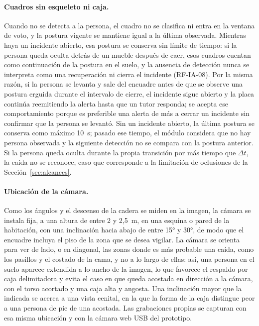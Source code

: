 \documentclass[12pt,a4paper,oneside]{book}
\theoremstyle{plain}
\theoremstyle{definition}
\theoremstyle{remark}
\begin{document}
\paragraph{Cuadros sin esqueleto ni caja.} Cuando no se detecta a la persona, el cuadro no se clasifica ni entra en la ventana de voto, y la postura vigente se mantiene igual a la última observada. Mientras haya un incidente abierto, esa postura se conserva sin límite de tiempo: si la persona queda oculta detrás de un mueble después de caer, esos cuadros cuentan como continuación de la postura en el suelo, y la ausencia de detección nunca se interpreta como una recuperación ni cierra el incidente (RF-IA-08). Por la misma razón, si la persona se levanta y sale del encuadre antes de que se observe una postura erguida durante el intervalo de cierre, el incidente sigue abierto y la placa continúa reemitiendo la alerta hasta que un tutor responda; se acepta ese comportamiento porque es preferible una alerta de más a cerrar un incidente sin confirmar que la persona se levantó. Sin un incidente abierto, la última postura se conserva como máximo 10~s; pasado ese tiempo, el módulo considera que no hay persona observada y la siguiente detección no se compara con la postura anterior. Si la persona queda oculta durante la propia transición por más tiempo que $\Delta t$, la caída no se reconoce, caso que corresponde a la limitación de oclusiones de la Sección~\ref{sec:alcances}.

\paragraph{Ubicación de la cámara.} Como los ángulos y el descenso de la cadera se miden en la imagen, la cámara se instala fija, a una altura de entre 2 y 2,5~m, en una esquina o pared de la habitación, con una inclinación hacia abajo de entre 15° y 30°, de modo que el encuadre incluya el piso de la zona que se desea vigilar. La cámara se orienta para ver de lado, o en diagonal, las zonas donde es más probable una caída, como los pasillos y el costado de la cama, y no a lo largo de ellas: así, una persona en el suelo aparece extendida a lo ancho de la imagen, lo que favorece el respaldo por caja delimitadora y evita el caso en que queda acostada en dirección a la cámara, con el torso acortado y una caja alta y angosta. Una inclinación mayor que la indicada se acerca a una vista cenital, en la que la forma de la caja distingue peor a una persona de pie de una acostada. Las grabaciones propias se capturan con esa misma ubicación y con la cámara web USB del prototipo.
\end{document}
